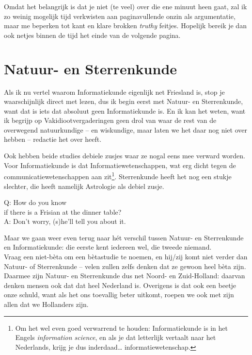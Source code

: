 \documentclass[print]{vakidioot}
\begin{document}
    \begin{multicols}{2}
        Omdat het belangrijk is dat je niet (te veel) over die ene minuut heen gaat, zal ik zo weinig mogelijk tijd verkwisten aan paginavullende onzin als argumentatie, maar me beperken tot kant en klare brokken \textit{truthy} feitjes. Hopelijk bereik je dan ook netjes binnen de tijd het einde van de volgende pagina.
    
        \section*{\vspace{-.5\baselineskip}Natuur- en Sterrenkunde}
        Als ik nu vertel waarom Informatiekunde eigenlijk net Friesland is, stop je waarschijnlijk direct met lezen, dus ik begin eerst met Natuur- en Sterrenkunde, want dat is iets dat absoluut geen Informatiekunde is. En ik kan het weten, want ik begrijp op Vakidiootvergaderingen geen drol van waar de rest van de overwegend natuurkundige -- en wiskundige, maar laten we het daar nog niet over hebben -- redactie het over heeft.
        
        Ook hebben beide studies debiele zusjes waar ze nogal eens mee verward worden. Voor Informatiekunde is dat Informatiewetenschappen, wat erg dicht tegen de communicatiewetenschappen aan zit\footnote{Om het wel even goed verwarrend te houden: Informatiekunde is in het Engels \textit{information science}, en als je dat letterlijk vertaalt naar het Nederlands, krijg je dus inderdaad\ldots{} informatiewetenschap.}. Sterrenkunde heeft het nog een stukje slechter, die heeft namelijk Astrologie als debiel zusje.

        \begin{pullquote}
          Q: How do you know\\ if there is a Frisian at the dinner table?\\
          A: Don't worry, (s)he'll tell you about it.
        \end{pullquote}
        
        Maar we gaan weer even terug naar hét verschil tussen Natuur- en Sterrenkunde en Informatiekunde: die eerste kent iedereen wel, die tweede niemand.\\
        Vraag een niet-bèta om een bètastudie te noemen, en hij/zij komt niet verder dan Natuur- of Sterrenkunde -- velen zullen zelfs denken dat ze gewoon heel bèta zijn. Daarmee zijn Natuur- en Sterrenkunde dus net Noord- en Zuid-Holland: daarvan denken mensen ook dat dat heel Nederland is. Overigens is dat ook een beetje onze schuld, want als het ons toevallig beter uitkomt, roepen we ook met zijn allen dat we Hollanders zijn. %
        

\end{multicols}
\end{document}
